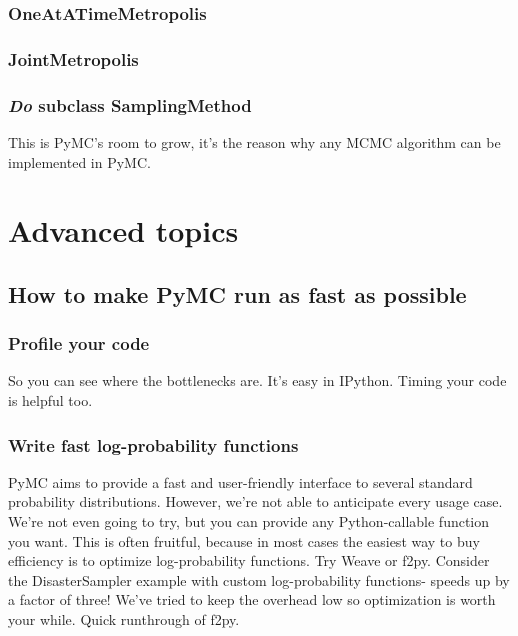 \documentclass[]{book}
\begin{document}
\subsection{OneAtATimeMetropolis}\label{sub:oneatatimemetropolis} %

\subsection{JointMetropolis}\label{sub:jointmetropolis} %

\subsection{\emph{Do} subclass SamplingMethod}\label{sub:do_subclass} %
This is PyMC's room to grow, it's the reason why any MCMC algorithm can be implemented in PyMC.





\chapter{Advanced topics} 

\section{How to make PyMC run as fast as possible}\label{sec:fast} %
\subsection{Profile your code}\label{sub:profile_your_code} %
So you can see where the bottlenecks are. It's easy in IPython. Timing your code is helpful too.

\subsection{Write fast log-probability functions}\label{sub:write_fast_log_probability_functions} %

PyMC aims to provide a fast and user-friendly interface to several standard probability distributions. However, we're not able to anticipate every usage case. We're not even going to try, but you can provide any Python-callable function you want. This is often fruitful, because in most cases the easiest way to buy efficiency is to optimize log-probability functions. Try Weave or f2py. Consider the DisasterSampler example with custom log-probability functions- speeds up by a factor of three! We've tried to keep the overhead low so optimization is worth your while. Quick runthrough of f2py.
\end{document}
